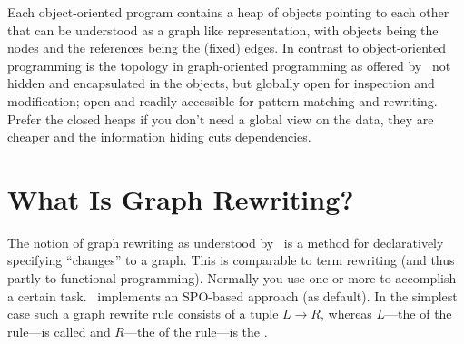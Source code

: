 Each object-oriented program contains a heap of objects pointing to each other that can be understood as a graph like representation, with objects being the nodes and the references being the (fixed) edges.
In contrast to object-oriented programming is the topology in graph-oriented programming as offered by \GrG\ not hidden and encapsulated in the objects, but globally open for inspection and modification;
open and readily accessible for pattern matching and rewriting.
Prefer the closed heaps if you don't need a global view on the data, they are cheaper and the information hiding cuts dependencies.



\section{What Is Graph Rewriting?}
\label{ov:whatsallabout}

The notion of graph rewriting as understood by \GrG\ is a method for declaratively specifying ``changes'' to a graph.
This is comparable to term rewriting (and thus partly to functional programming).
Normally you use one or more  to accomplish a certain task.
\GrG\ implements an SPO-based approach (as default).
In the simplest case such a graph rewrite rule consists of a tuple $L \rightarrow R$, whereas $L$---the  of the rule---is called  and $R$---the  of the rule---is the .

